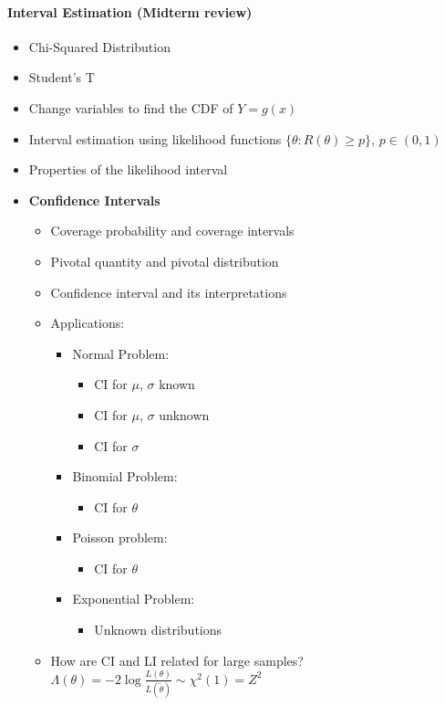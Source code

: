 \documentclass[10pt,letter]{article}
\theoremstyle{plain}
\theoremstyle{definition}
\begin{document}
\paragraph{Interval Estimation (Midterm review)}
\begin{itemize}
    \item Chi-Squared Distribution 
    \item Student's T 
    \item Change variables to find the CDF of $Y=g(x)$ 
    \item Interval estimation using likelihood functions $\{\theta:R(\theta)\geq p\}$, $p\in(0,1)$ 
    \item Properties of the likelihood interval 
    \item \textbf{Confidence Intervals}\begin{itemize}
        \item Coverage probability and coverage intervals 
        \item Pivotal quantity and pivotal distribution 
        \item Confidence interval and its interpretations
        \item Applications: \begin{itemize}
            \item Normal Problem: \begin{itemize}
                \item CI for $\mu$, $\sigma$ known 
                \item CI for $\mu$, $\sigma$ unknown 
                \item CI for $\sigma$ 
            \end{itemize}
            \item Binomial Problem: \begin{itemize}
                \item CI for $\theta$ 
            \end{itemize}
            \item Poisson problem: \begin{itemize}
                \item CI for $\theta$
            \end{itemize}
            \item Exponential Problem: \begin{itemize}
                \item Unknown distributions
            \end{itemize}
        \end{itemize}
        \item How are CI and LI related for large samples? $\Lambda(\theta)=-2\log\frac{L(\theta)}{L(\tilde{\theta})}\sim\chi^2(1)=Z^2$
    \end{itemize}
\end{itemize}
\end{document}
